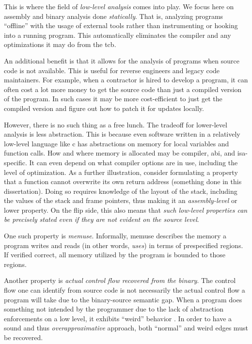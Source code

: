 This is where the field of \emph{low-level analysis} comes into play.
We focus here on assembly and binary analysis done \emph{statically}.
That is, analyzing programs ``offline'' with the usage of external tools rather than instrumenting or hooking into a running program.
This automatically eliminates the compiler and any optimizations it may do from the \gls{tcb}.

An additional benefit is that it allows for the analysis of programs when source code is not available.
This is useful for reverse engineers and legacy code maintainers.
For example, when a contractor is hired to develop a program, it can often cost a lot more money to get the source code than just a compiled version of the program.
In such cases it may be more cost-efficient to just get the compiled version and figure out how to patch it for updates locally.

However, there is no such thing as a free lunch.
The tradeoff for lower-level analysis is less abstraction.
This is because even software written in a relatively low-level language like \gls{c} has abstractions on memory for local variables and function calls.
How and where memory is allocated may be compiler, \gls{abi}, and \gls{isa}-specific.
It can even depend on what compiler options are in use, including the level of optimization.
As a further illustration, consider formulating a property that a function cannot overwrite its own return address (something done in this dissertation).
Doing so requires knowledge of the layout of the stack, including the values of the stack and frame pointers, thus making it an \emph{assembly-level} or lower property.
On the flip side, this also means that \emph{such low-level properties can be precisely stated even if they are not evident on the source level}.

One such property is \emph{\gls{memuse}}.
Informally, \gls{memuse} describes the memory a program writes and reads (in other words, \emph{uses}) in terms of prespecified regions.
If verified correct, all memory utilized by the program is bounded to those regions.

Another property is \emph{actual control flow recovered from the binary}.
The control flow one can identify from source code is not necessarily the actual control flow a program will take due to the binary-source semantic gap.
When a program does something not intended by the programmer due to the lack of abstraction enforcements on a low level, it exhibits ``weird'' behavior \autocite{shapiro2013weird,dullien2017weird}.
In order to have a sound and thus \emph{overapproximative} approach, both ``normal'' and weird edges must be recovered.

